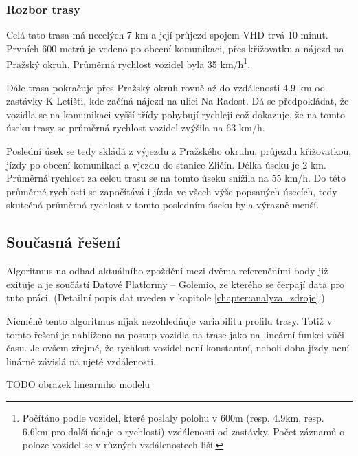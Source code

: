 \subsubsection{Rozbor trasy}

Celá tato trasa má necelých 7 km a její průjezd spojem VHD trvá 10 minut. Prvních 600 metrů je vedeno po obecní komunikaci, přes křižovatku a nájezd na Pražský okruh. Průměrná rychlost vozidel byla 35 km/h\footnote{Počítáno podle vozidel, které poslaly polohu v 600m (resp. 4.9km, resp. 6.6km pro další údaje o rychlosti) vzdálenosti od zastávky. Počet záznamů o poloze vozidel se v různých vzdálenostech liší.}.

\bigbreak

Dále trasa pokračuje přes Pražský okruh rovně až do vzdálenosti 4.9 km od zastávky K Letišti, kde začíná nájezd na ulici Na Radost. Dá se předpokládat, že vozidla se na komunikaci vyšší třídy pohybují rychleji což dokazuje, že na tomto úseku trasy se průměrná rychlost vozidel zvýšila na 63 km/h.

\bigbreak

Poslední úsek se tedy skládá z výjezdu z Pražského okruhu, průjezdu křižovatkou, jízdy po obecní komunikaci a vjezdu do stanice Zličín. Délka úseku je 2 km. Průměrná rychlost za celou trasu se na tomto úseku snížila na 55 km/h. Do této průměrné rychlosti se započítává i jízda ve všech výše popsaných úsecích, tedy skutečná průměrná rychlost v tomto posledním úseku byla výrazně menší.


\subsection{Současná řešení} \label{subsection:soucasna_reseni_odhadu}

Algoritmus na odhad aktuálního zpoždění mezi dvěma referenčními body již exituje a je součástí Datové Platformy -- Golemio, ze kterého se čerpají data pro tuto práci. (Detailní popis dat uveden v kapitole \ref{chapter:analyza_zdroje}.)

\bigbreak

Nicméně tento algoritmus nijak nezohledňuje variabilitu profilu trasy. Totiž v tomto řešení je nahlíženo na postup vozidla na trase jako na lineární funkci vůči času. Je ovšem zřejmé, že rychlost vozidel není konstantní, neboli doba jízdy není linárně závislá na ujeté vzdálenosti.

\bigbreak

TODO obrazek linearniho modelu

\bigbreak

